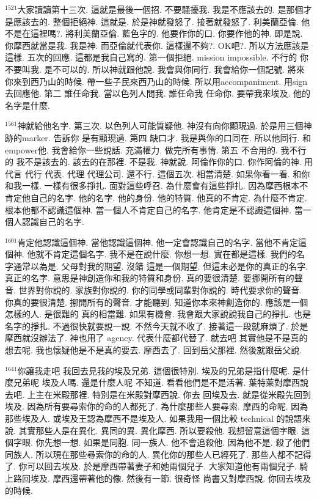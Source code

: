 \documentclass{book}
\begin{document}
$^{1521}$大家讀讀第十三次.
這就是最後一個招.
不要騷擾我.
我是不應該去的.
是那個才是應該去的.
整個拒絕神.
這就是.
於是神就發怒了.
接著就發怒了.
利美蘭亞倫.
他不是在這裡嗎?.
將利美蘭亞倫.
藍色字的.
他要作你的口.
你要作他的神.
即是說.
你摩西就當是我.
我是神.
而亞倫就代表你.
這樣還不夠?.
OK吧?.
所以方法應該是這樣.
五次的回應.
這都是我自己寫的.
第一個拒絕.
mission impossible.
不行的 你不要叫我.
是不可以的.
所以神就跟他說.
我會與你同行.
我會給你一個記號.
將來你來到西乃山的時候.
帶一些子民來西乃山的時候.
所以用accompaniment.
用sign去回應他.
第二 誰任命我.
當以色列人問我.
誰任命我 任命你.
要帶我來埃及.
他的名字是什麼.

$^{1561}$神就給他名字.
第三次.
以色列人可能質疑他.
神沒有向你顯現過.
於是用三個神跡的marker.
告訴你 是有顯現過.
第四 缺口才.
我是與你的口同在.
所以他同行.
和empower他.
我會給你一些說話.
充滿權力.
做完所有事情.
第五 不合用的.
我不行的 我不是該去的.
該去的在那裡.
不是我.
神就說.
阿倫作你的口.
你作阿倫的神.
用代言 代行 代表.
代理 代理公司.
還不行.
這個五次.
相當清楚.
如果你看一看.
和你和我一樣.
一樣有很多掙扎.
面對這些呼召.
為什麼會有這些掙扎.
因為摩西根本不肯定他自己的名字.
他的名字.
他的身份.
他的特質.
他真的不肯定.
為什麼不肯定.
根本他都不認識這個神.
當一個人不肯定自己的名字.
他肯定是不認識這個神.
當一個人認識自己的名字.

$^{1601}$肯定他認識這個神.
當他認識這個神.
他一定會認識自己的名字.
當他不肯定這個神.
他就不肯定這個名字.
我不是在說什麼.
你想一想.
實在都是這樣.
我們的名字通常以為是.
父母對我的期望.
沒錯 這是一個期望.
但這未必是你的真正的名字.
真正的名字.
意思是神創造你和我的特質和身份.
真的要很清楚.
要挪開所有的聲音.
世界對你說的.
家族對你說的.
你的同學或同輩對你說的.
時代要求你的聲音.
你真的要很清楚.
挪開所有的聲音.
才能聽到.
知道你本來神創造你的.
應該是一個怎樣的人.
是很難的 真的相當難.
如果有機會.
我會跟大家說說我自己的掙扎.
也是名字的掙扎.
不過很快就要說一說.
不然今天就不收了.
接著這一段就麻煩了.
於是摩西就沒辦法了.
神也用了 agency.
代表什麼都代替了.
就去吧 其實他是不是真的想去呢.
我也懷疑他是不是真的要去.
摩西去了.
回到岳父那裡.
然後就跟岳父說.

$^{1641}$你讓我走吧 我回去見我的埃及兄弟.
這個很特別.
埃及的兄弟是指什麼呢.
是什麼兄弟呢 埃及人嗎.
還是什麼人呢 不知道.
看看他們是不是活著.
葉特萊對摩西說 去吧.
上主在米殿那裡.
特別是在米殿對摩西說.
你去 回埃及去.
就是從米殿先回到埃及.
因為所有要尋索你的命的人都死了.
為什麼那些人要尋索.
摩西的命呢.
因為那些埃及人.
或埃及王認為摩西不是埃及人.
如果我用一個比較 technical 的說語來說.
其實那些人是在異化.
異同的異.
異化摩西.
所以要殺他.
我想留意這個字眼.
這個字眼.
你先想一想.
如果是同胞.
同一族人.
他不會追殺他.
因為他不是.
殺了他們同族人.
所以現在那些尋索你的命的人.
異化你的那些人已經死了.
那些人都不記得了.
你可以回去埃及.
於是摩西帶著妻子和她兩個兒子.
大家知道他有兩個兒子.
騎上路回埃及.
摩西還帶著他的像.
然後有一節.
很奇怪 尚書又對摩西說.
你回去埃及的時候.
\end{document}
